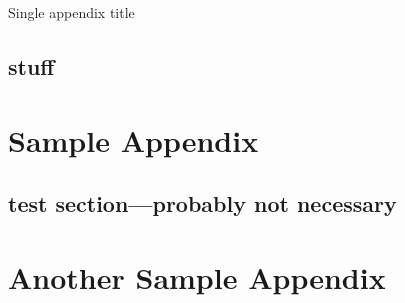 \documentclass[microe]{ritthesis}
\begin{document}
\nocite{cheung,zhao,cao,zhang}

\nocite{*}


\begin{theappendix}{Single appendix title}
	\section{stuff}
	\lipsum[15-21]
\end{theappendix}

\appendix

\chapter{Sample Appendix}

\section{test section---probably not necessary}
\lipsum[6-12]
\chapter{Another Sample Appendix}
\lipsum[10-11]

\end{document}
